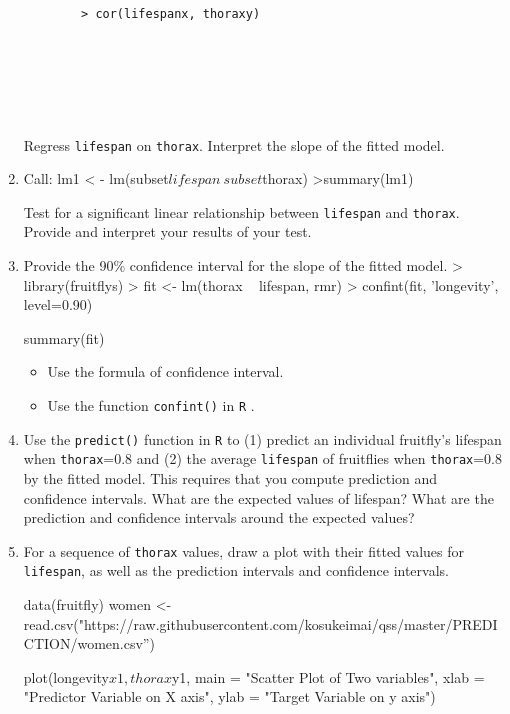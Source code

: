 \documentclass[12pt,letterpaper]{article}
\begin{document}
\begin{enumerate}
\begin{verbatim}
		> cor(lifespanx, thoraxy)
		
	
	
		
		
	\end{verbatim}
		
		Regress \texttt{lifespan} on \texttt{thorax}.  Interpret the slope of the fitted model.
		\vspace{6cm}
		\item
		
		Call: lm1 < - lm(subset$lifespan~subset$thorax)
		>summary(lm1)
		
		
		
		Test for a significant linear relationship between  \texttt{lifespan} and \texttt{thorax}. Provide and interpret your results of your test.
		
		\newpage
		\item
		
		
		
		
		Provide the 90\% confidence interval for the slope of the fitted model.
		> library(fruitflys)
		> fit <- lm(thorax ~ lifespan, rmr)
		> confint(fit, 'longevity', level=0.90)
		
		summary(fit)
		\vspace{.5cm}
		\begin{itemize}
			\item
			Use the formula of confidence interval.		\vspace{.5cm}
			\item
			Use the function  \texttt{confint()}  in \texttt{R} .
		\end{itemize}
		\vspace{6cm}
		\item Use the \texttt{predict()} function in \texttt{R} to (1) predict an individual fruitfly's lifespan when \texttt{thorax}=0.8 and (2) the average \texttt{lifespan} of fruitflies when \texttt{thorax}=0.8 by the fitted model. This requires that you compute prediction and confidence intervals. What are the expected values of lifespan? What are the prediction and confidence intervals around the expected values? 
		
		\vspace{6cm}
		\item	For a sequence of \texttt{thorax} values, draw a plot with their fitted values for \texttt{lifespan}, as well as the prediction intervals and confidence intervals.
		
		data(fruitfly)
		women <- read.csv("https://raw.githubusercontent.com/kosukeimai/qss/master/PREDICTION/women.csv”)
		
		
		plot(longevity$x1, thorax$y1,
		main = "Scatter Plot of Two variables",
		xlab = "Predictor Variable on X axis",
		ylab = "Target Variable on y axis")
		
		
	\end{enumerate}
\end{document}
